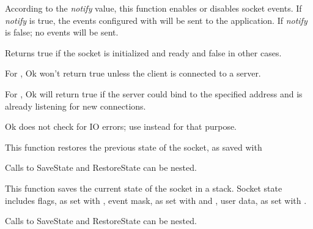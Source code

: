 %
%
\label{wxsocketbasenotify}


According to the {\it notify} value, this function enables
or disables socket events. If {\it notify} is true, the events
configured with  will
be sent to the application. If {\it notify} is false; no events
will be sent.

% 
%
\label{wxsocketbaseok}


Returns true if the socket is initialized and ready and false in other
cases.


For , Ok won't return true unless
the client is connected to a server.

For , Ok will return true if the
server could bind to the specified address and is already listening for
new connections.

Ok does not check for IO errors;
use  instead for that purpose.

%
%
\label{wxsocketbaserestorestate}


This function restores the previous state of the socket, as saved
with 

Calls to SaveState and RestoreState can be nested.



%
%
\label{wxsocketbasesavestate}


This function saves the current state of the socket in a stack. Socket
state includes flags, as set with ,
event mask, as set with  and 
, user data, as set with 
.

Calls to SaveState and RestoreState can be nested.

